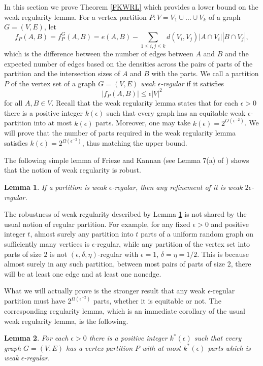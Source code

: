 \documentclass[11pt]{article}
\newtheorem{lemma}{Lemma}[section]
\begin{document}
In this section we prove Theorem \ref{FKWRL} which provides a lower bound on
the weak regularity lemma.
For a vertex partition $P:V=V_1 \cup \ldots \cup V_k$ of a graph $G=(V,E)$, let
$$f_P(A,B)=f_P^G(A,B)=e(A,B)-\sum_{1 \leq i, j \leq k}
d(V_i,V_j)|A \cap V_i||B \cap V_j|,$$ which is the difference between the
number of edges between $A$ and $B$ and the expected number of edges based on
the densities across the pairs of parts of the partition and the intersection
sizes of $A$ and $B$ with the parts. We call a partition $P$ of the vertex set
of a graph $G=(V,E)$ {\it weak $\epsilon$-regular}  if it satisfies
$$|f_P(A,B)| \leq \epsilon |V|^2$$ for all $A,B \in V$.
Recall that the weak regularity lemma states that for each $\epsilon>0$ there
is a positive integer $k(\epsilon)$ such that every graph has an equitable weak
$\epsilon$-partition into at most $k(\epsilon)$ parts. Moreover, one may take $k(\epsilon) = 2^{O(\epsilon^{-2})}$. We will prove that the number of parts required in the weak regularity lemma satisfies $k(\epsilon)=2^{\Omega(\epsilon^{-2})}$, thus matching the upper
bound. 

The following simple lemma of Frieze and Kannan (see Lemma 7(a) of
\cite{FrKa1}) shows that the notion of weak regularity is robust. 

\begin{lemma}\label{weakrobust}
If a partition is weak $\epsilon$-regular, then any refinement of it is weak
$2\epsilon$-regular.
\end{lemma}

The robustness of weak regularity described by Lemma \ref{weakrobust} is not
shared by the usual notion of regular partition. For example,
for any fixed $\epsilon>0$ and positive integer $t$, almost surely any
partition into $t$ parts of a uniform random graph on sufficiently many
vertices is $\epsilon$-regular, while any partition of the vertex set into
parts of size $2$ is not $(\epsilon,\delta,\eta)$-regular with $\epsilon=1$,
$\delta=\eta=1/2$. This is because almost surely in any such partition, between
most pairs of parts of size $2$, there will be at least one edge and at least
one nonedge.

What we will actually prove is the stronger result that any weak $\epsilon$-regular partition must have $2^{\Omega(\epsilon^{-2})}$ parts, whether it is equitable or not. The corresponding regularity lemma, which is an immediate corollary of the usual weak regularity lemma, is the following.

\begin{lemma} \label{noneqweak}
For each $\epsilon>0$ there is a positive integer $k^*(\epsilon)$ such that
every graph $G = (V, E)$ has a vertex partition $P$ with at most $k^*(\epsilon)$ parts
which is weak $\epsilon$-regular.
\end{lemma}
\end{document}
